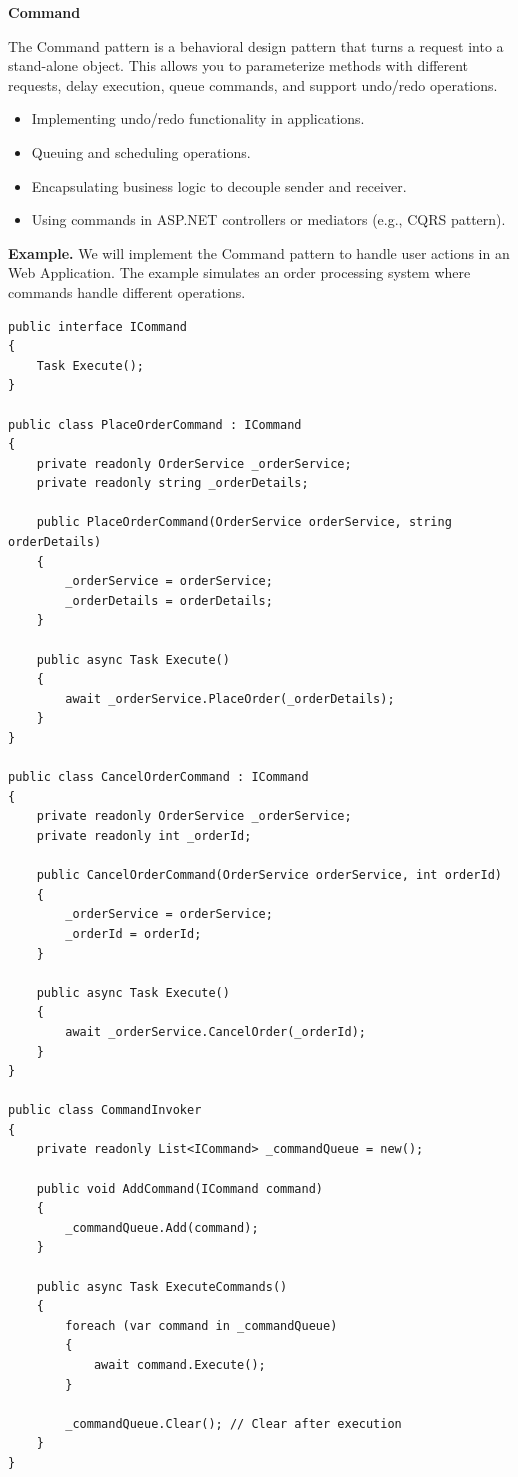 \medskip
\begin{center}
\textbf{Command}
\end{center}

The Command pattern is a behavioral design pattern that turns a request into a stand-alone object. This allows you to parameterize methods with different requests, delay execution, queue commands, and support undo/redo operations.

\begin{itemize}
\item Implementing undo/redo functionality in applications.

\item Queuing and scheduling operations.

\item Encapsulating business logic to decouple sender and receiver.

\item Using commands in ASP.NET controllers or mediators (e.g., CQRS pattern).


\end{itemize}

\textbf{Example.} We will implement the Command pattern to handle user actions in an Web Application. The example simulates an order processing system where commands handle different operations.

\begin{lstlisting}
public interface ICommand
{
    Task Execute();
}

public class PlaceOrderCommand : ICommand
{
    private readonly OrderService _orderService;
    private readonly string _orderDetails;

    public PlaceOrderCommand(OrderService orderService, string orderDetails)
    {
        _orderService = orderService;
        _orderDetails = orderDetails;
    }

    public async Task Execute()
    {
        await _orderService.PlaceOrder(_orderDetails);
    }
}

public class CancelOrderCommand : ICommand
{
    private readonly OrderService _orderService;
    private readonly int _orderId;

    public CancelOrderCommand(OrderService orderService, int orderId)
    {
        _orderService = orderService;
        _orderId = orderId;
    }

    public async Task Execute()
    {
        await _orderService.CancelOrder(_orderId);
    }
}

public class CommandInvoker
{
    private readonly List<ICommand> _commandQueue = new();

    public void AddCommand(ICommand command)
    {
        _commandQueue.Add(command);
    }

    public async Task ExecuteCommands()
    {
        foreach (var command in _commandQueue)
        {
            await command.Execute();
        }

        _commandQueue.Clear(); // Clear after execution
    }
}
\end{lstlisting}







